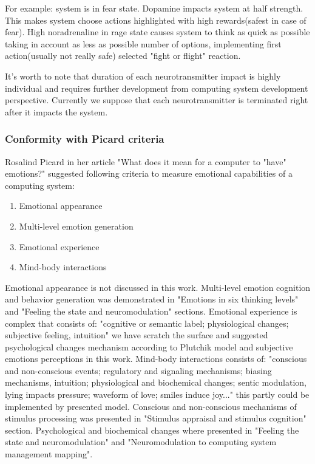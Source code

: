 For example: system is in fear state. Dopamine impacts system at half strength. This makes system choose actions highlighted with high rewards(safest in case of fear). High noradrenaline in rage state causes system to think as quick as possible taking in account as less as possible number of options, implementing first action(usually not really safe) selected "fight or flight" reaction.

It's worth to note that duration of each neurotransmitter impact is highly individual and requires further development from computing system development perspective. Currently we suppose that each neurotransmitter is terminated right after it impacts the system.

\subsubsection{Conformity with Picard criteria}

Rosalind Picard in her article "What does it mean for a computer to "have" emotions?"\cite{whatdoesitmeanforcomputer} suggested following criteria to measure emotional capabilities of a computing system:

\begin{enumerate}
\item  Emotional appearance
\item  Multi-level emotion generation
\item  Emotional experience
\item  Mind-body interactions
\end{enumerate}

Emotional appearance is not discussed in this work. Multi-level emotion cognition and behavior generation was demonstrated in "Emotions in six thinking levels" and "Feeling the state and neuromodulation" sections. Emotional experience is complex that consists of: "cognitive or semantic label; physiological changes; subjective feeling, intuition" we have scratch the surface and suggested psychological changes mechanism according to Plutchik model and subjective emotions perceptions in this work. Mind-body interactions consists of: "conscious and non-conscious events; regulatory and signaling mechanisms; biasing mechanisms, intuition; physiological and biochemical changes; sentic modulation, lying impacts pressure; waveform of love; smiles induce joy..." this partly could be implemented by presented model. Conscious and non-conscious mechanisms of stimulus processing was presented in "Stimulus appraisal and stimulus cognition" section. Psychological and biochemical changes where presented in "Feeling the state and neuromodulation" and "Neuromodulation to computing system management mapping".

